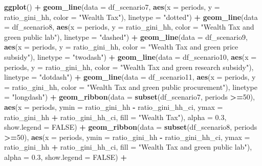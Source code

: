 \documentclass[
]{article}
\newenvironment{Shaded}{\begin{snugshade}}{\end{snugshade}}
\newcommand{\AttributeTok}[1]{\textcolor[rgb]{0.13,0.29,0.53}{#1}}
\newcommand{\ConstantTok}[1]{\textcolor[rgb]{0.56,0.35,0.01}{#1}}
\newcommand{\DecValTok}[1]{\textcolor[rgb]{0.00,0.00,0.81}{#1}}
\newcommand{\FloatTok}[1]{\textcolor[rgb]{0.00,0.00,0.81}{#1}}
\newcommand{\FunctionTok}[1]{\textcolor[rgb]{0.13,0.29,0.53}{\textbf{#1}}}
\newcommand{\NormalTok}[1]{#1}
\newcommand{\SpecialCharTok}[1]{\textcolor[rgb]{0.81,0.36,0.00}{\textbf{#1}}}
\newcommand{\StringTok}[1]{\textcolor[rgb]{0.31,0.60,0.02}{#1}}
\begin{document}
\begin{Shaded}
\begin{Highlighting}[]
\FunctionTok{ggplot}\NormalTok{() }\SpecialCharTok{+}
  \FunctionTok{geom\_line}\NormalTok{(}\AttributeTok{data =}\NormalTok{ df\_scenario7, }\FunctionTok{aes}\NormalTok{(}\AttributeTok{x =}\NormalTok{ periods, }\AttributeTok{y =}\NormalTok{ ratio\_gini\_hh, }\AttributeTok{color =} \StringTok{"Wealth Tax"}\NormalTok{), }\AttributeTok{linetype =} \StringTok{"dotted"}\NormalTok{) }\SpecialCharTok{+}
  \FunctionTok{geom\_line}\NormalTok{(}\AttributeTok{data =}\NormalTok{ df\_scenario8, }\FunctionTok{aes}\NormalTok{(}\AttributeTok{x =}\NormalTok{ periods, }\AttributeTok{y =}\NormalTok{ ratio\_gini\_hh, }\AttributeTok{color =} \StringTok{"Wealth Tax and green public lab"}\NormalTok{), }\AttributeTok{linetype =} \StringTok{"dashed"}\NormalTok{) }\SpecialCharTok{+}
  \FunctionTok{geom\_line}\NormalTok{(}\AttributeTok{data =}\NormalTok{ df\_scenario9, }\FunctionTok{aes}\NormalTok{(}\AttributeTok{x =}\NormalTok{ periods, }\AttributeTok{y =}\NormalTok{ ratio\_gini\_hh, }\AttributeTok{color =} \StringTok{"Wealth Tax and green price subsidy"}\NormalTok{), }\AttributeTok{linetype =} \StringTok{"twodash"}\NormalTok{) }\SpecialCharTok{+}
  \FunctionTok{geom\_line}\NormalTok{(}\AttributeTok{data =}\NormalTok{ df\_scenario10, }\FunctionTok{aes}\NormalTok{(}\AttributeTok{x =}\NormalTok{ periods, }\AttributeTok{y =}\NormalTok{ ratio\_gini\_hh, }\AttributeTok{color =} \StringTok{"Wealth Tax and green research subsidy"}\NormalTok{), }\AttributeTok{linetype =} \StringTok{"dotdash"}\NormalTok{) }\SpecialCharTok{+}
  \FunctionTok{geom\_line}\NormalTok{(}\AttributeTok{data =}\NormalTok{ df\_scenario11, }\FunctionTok{aes}\NormalTok{(}\AttributeTok{x =}\NormalTok{ periods, }\AttributeTok{y =}\NormalTok{ ratio\_gini\_hh, }\AttributeTok{color =} \StringTok{"Wealth Tax and green public procurement"}\NormalTok{), }\AttributeTok{linetype =} \StringTok{"longdash"}\NormalTok{) }\SpecialCharTok{+}
  \FunctionTok{geom\_ribbon}\NormalTok{(}\AttributeTok{data =} \FunctionTok{subset}\NormalTok{(df\_scenario7, periods }\SpecialCharTok{\textgreater{}=}\DecValTok{50}\NormalTok{), }\FunctionTok{aes}\NormalTok{(}\AttributeTok{x =}\NormalTok{ periods, }\AttributeTok{ymin =}\NormalTok{ ratio\_gini\_hh }\SpecialCharTok{{-}}\NormalTok{ ratio\_gini\_hh\_ci, }\AttributeTok{ymax =}\NormalTok{ ratio\_gini\_hh }\SpecialCharTok{+}\NormalTok{ ratio\_gini\_hh\_ci, }\AttributeTok{fill =} \StringTok{"Wealth Tax"}\NormalTok{), }\AttributeTok{alpha =} \FloatTok{0.3}\NormalTok{, }\AttributeTok{show.legend =} \ConstantTok{FALSE}\NormalTok{) }\SpecialCharTok{+}
  \FunctionTok{geom\_ribbon}\NormalTok{(}\AttributeTok{data =} \FunctionTok{subset}\NormalTok{(df\_scenario8, periods }\SpecialCharTok{\textgreater{}=}\DecValTok{50}\NormalTok{), }\FunctionTok{aes}\NormalTok{(}\AttributeTok{x =}\NormalTok{ periods, }\AttributeTok{ymin =}\NormalTok{ ratio\_gini\_hh }\SpecialCharTok{{-}}\NormalTok{ ratio\_gini\_hh\_ci, }\AttributeTok{ymax =}\NormalTok{ ratio\_gini\_hh }\SpecialCharTok{+}\NormalTok{ ratio\_gini\_hh\_ci, }\AttributeTok{fill =} \StringTok{"Wealth Tax and green public lab"}\NormalTok{), }\AttributeTok{alpha =} \FloatTok{0.3}\NormalTok{, }\AttributeTok{show.legend =} \ConstantTok{FALSE}\NormalTok{) }\SpecialCharTok{+}

\end{Highlighting}
\end{Shaded}
\end{document}
